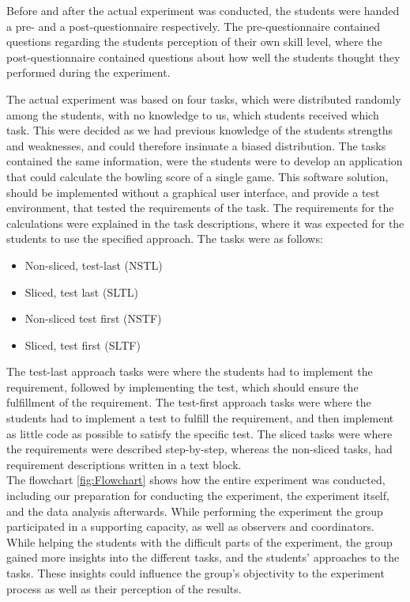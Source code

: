 \documentclass{sig-alternate-05-2015}
\begin{document}
Before and after the actual experiment was conducted, the students were handed a pre- and a post-questionnaire respectively.
The pre-questionnaire contained questions regarding the students perception of their own skill level, where the post-questionnaire contained questions about how well the students thought they performed during the experiment.

The actual experiment was based on four tasks, which were distributed randomly among the students, with no knowledge to us, which students received which task. This were decided as we had previous knowledge of the students strengths and weaknesses, and could therefore insinuate a biased distribution. The tasks contained the same information, were the students were to develop an application that could calculate the bow\-ling score of a single game. This software solution, should be implemented without a graphical user interface, and provide a test environment, that tested the requirements of the task. The requirements for the calculations were explained in the task descriptions, where it was expected for the students to use the specified approach.
The tasks were as follows:
\begin{itemize}
\item Non-sliced, test-last (NSTL)
\item Sliced, test last (SLTL)
\item Non-sliced test first (NSTF)
\item Sliced, test first (SLTF)
\end{itemize}
The test-last approach tasks were where the students had to implement the requirement, followed by implementing the test, which should ensure the fulfillment of the requirement.
The test-first approach tasks were where the students had to implement a test to fulfill the requirement, and then implement as little code as possible to satisfy the specific test.
The sliced tasks were where the requirements were described step-by-step, whereas the non-sliced tasks, had requirement descriptions written in a text block.\\



The flowchart \ref{fig:Flowchart} shows how the entire experiment was conducted, including our preparation for conducting the experiment, the experiment itself, and the data analysis afterwards.
While performing the experiment the group participated in a supporting capacity, as well as observers and coordinators. While helping the students with the difficult parts of the experiment, the group gained more insights into the different tasks, and the students' approaches to the tasks. These insights could influence the group's objectivity to the experiment process as well as their perception of the results.
\end{document}

